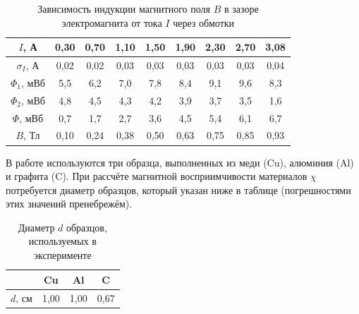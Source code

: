 \documentclass[a4paper,12pt]{article}
\begin{document}
\begin{table}[h]
	\centering
	\caption{Зависимость индукции магнитного поля $B$ в зазоре электромагнита от тока $I$ через обмотки} \label{Калибровка}
	\begin{tabular}{|c|c|c|c|c|c|c|c|c|}
		\hline
		$I$, А & 0,30 & 0,70 & 1,10 & 1,50 & 1,90 & 2,30 & 2,70 & 3,08 \\ \hline
		$\sigma_I$, А & 0,02 & 0,02 & 0,03 & 0,03 & 0,03 & 0,03 & 0,03 & 0,04 \\ \hline
		$\Phi_1$, мВб & 5,5 & 6,2 & 7,0 & 7,8 & 8,4 & 9,1 & 9,6 & 8,3 \\ \hline
		$\Phi_2$, мВб & 4,8 & 4,5 & 4,3 & 4,2 & 3,9 & 3,7 & 3,5 & 1,6 \\ \hline
		$\Phi$, мВб & 0,7 & 1,7 & 2,7 & 3,6 & 4,5 & 5,4 & 6,1 & 6,7 \\ \hline
		$B$, Тл & 0,10 & 0,24 & 0,38 & 0,50 & 0,63 & 0,75 & 0,85 & 0,93 \\ \hline
	\end{tabular}
\end{table}

В работе используются три образца, выполненных из меди (Cu), алюминия (Al) и графита (C). При рассчёте магнитной восприимчивости материалов $\chi$ потребуется диаметр образцов, который указан ниже в таблице  (погрешностями этих значений пренебрежём).

\begin{table}[h]
	\centering
	\caption{Диаметр $d$ образцов, используемых в эксперименте} \label{Параметры}
	\begin{tabular}{|c|c|c|c|}
		\hline
		  & Cu & Al & C \\ \hline
		$d$, см & 1,00 & 1,00 & 0,67 \\ \hline
	\end{tabular}
\end{table}
\end{document}

